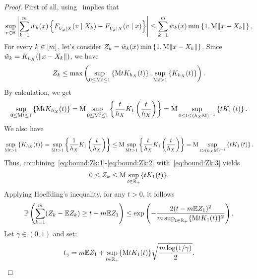 \begin{proof}
  First of all, using~ implies that
  \begin{equation*}
    \sup_{v\in\mathbb{R}} \left\lvert{\sum_{k=1}^{m} \tilde{w}_{k}(x) \left\{{F_{\tilde{V}_{\varphi}\mid X}(v \mid X_k) - F_{\tilde{V}_{\varphi}\mid X}(v \mid x)}\right\}}\right\rvert
    \le \sum_{k=1}^{m} \tilde{w}_{k}(x) \min\left\{{1, \mathrm{M}\|{x-X_k}\|}\right\}.
  \end{equation*}
  For every $k\in[m]$, let's consider $Z_k = \tilde{w}_{k}(x) \min\left\{{1, \mathrm{M}\|{x-X_k}\|}\right\}$.
  Since $\tilde{w}_k=K_{h_X}(\left\|{x-X_k}\right\|)$, we have
  \begin{equation}\label{eq:bound:Zk:1}
    Z_k
    \le \max\left({\sup_{0\le \mathrm{M} t\le 1}\left\{{ \mathrm{M} t K_{h_X}(t)}\right\}, \sup_{\mathrm{M} t > 1}\left\{{K_{h_X}(t)}\right\}}\right).
  \end{equation}
  By calculation, we get
  \begin{equation}\label{eq:bound:Zk:2}
    \sup_{0\le \mathrm{M} t\le 1}\left\{{ \mathrm{M} t K_{h_X}(t) }\right\}
    = \mathrm{M} \sup_{0\le \mathrm{M} t\le 1}\left\{{ \frac{t}{h_X} K_{1}\left({\frac{t}{h_X}}\right) }\right\}
    = \mathrm{M} \sup_{0\le t\le (h_X\mathrm{M})^{-1}}\left\{{ t K_{1}\left({t}\right) }\right\}.
  \end{equation}
  We also have
  \begin{equation}
  \label{eq:bound:Zk:3}
    \sup_{\mathrm{M} t > 1}\left\{{K_{h_X}(t)}\right\}
    = \sup_{\mathrm{M} t > 1} \left\{{\frac{1}{h_X} K_{1} \left({\frac{t}{h_{X}}}\right)}\right\}
    \le \mathrm{M} \sup_{\mathrm{M} t > 1} \left\{{\frac{t}{h_X} K_{1} \left({\frac{t}{h_{X}}}\right)}\right\}
    = \mathrm{M} \sup_{t> (h_X\mathrm{M})^{-1}}\left\{{ t K_{1}\left({t}\right) }\right\}.
  \end{equation}
  Thus, combining~\eqref{eq:bound:Zk:1}-\eqref{eq:bound:Zk:2} with~\eqref{eq:bound:Zk:3} yields
  \begin{equation*}
    0 
    \le Z_k 
    \le \mathrm{M}\sup_{t\in\mathbb{R}_+}\{{t K_{1}(t)}\}.
  \end{equation*}
  Applying Hoeffding's inequality, for any $t>0$, it follows
  \begin{equation}\label{eq:bound:Zk:4}
    \mathbb{P}\left({ \sum_{k=1}^{m} (Z_k-\mathbb{E} Z_k) \ge t - m \mathbb{E} Z_1}\right)
    \le \exp\left({-\frac{2(t-m \mathbb{E} Z_1)^{2}}{m \sup_{t\in\mathbb{R}_+}\{{\mathrm{M} t K_{1}(t)}\}^2}}\right).
  \end{equation}
  Let $\gamma\in(0,1)$ and set:
  \begin{equation*}
    t_{\gamma} = m \mathbb{E} Z_1 + \sup_{t\in\mathbb{R}_+}\{{\mathrm{M} t K_{1}(t)}\} \sqrt{\frac{m \log(1/\gamma)}{2}}.
  \end{equation*}

\end{proof}

